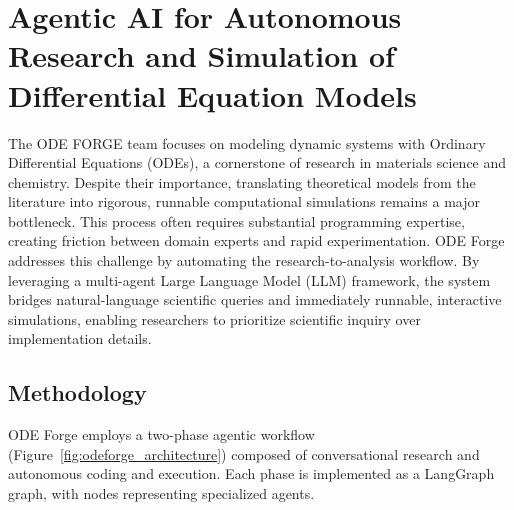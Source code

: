 
\section{Agentic AI for Autonomous Research and Simulation of Differential Equation Models}

The ODE FORGE team focuses on modeling dynamic systems with Ordinary Differential Equations (ODEs), a cornerstone of research in materials science and chemistry. Despite their importance, translating theoretical models from the literature into rigorous, runnable computational simulations remains a major bottleneck. This process often requires substantial programming expertise, creating friction between domain experts and rapid experimentation. ODE Forge addresses this challenge by automating the research-to-analysis workflow. By leveraging a multi-agent Large Language Model (LLM) framework, the system bridges natural-language scientific queries and immediately runnable, interactive simulations, enabling researchers to prioritize scientific inquiry over implementation details.


\subsection*{Methodology}

ODE Forge employs a two-phase agentic workflow (Figure~\ref{fig:odeforge_architecture}) composed of conversational research and autonomous coding and execution. Each phase is implemented as a LangGraph \cite{langchain2023} graph, with nodes representing specialized agents.

